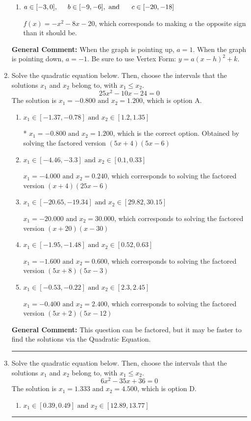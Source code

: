 \documentclass{extbook}[14pt]
\newcommand{\litem}[1]{\item #1

\rule{\textwidth}{0.4pt}}
\begin{document}
\begin{enumerate}
{\begin{enumerate}[label=\Alph*.]
* $f(x)=x^{2} +8 x + 12$, which is the correct option.
\item \( a \in [-3, 0], \hspace*{5mm} b \in [-9, -6], \text{ and } \hspace*{5mm} c \in [-20, -18] \)

$f(x)=-x^{2} -8 x -20$, which corresponds to making $a$ the opposite sign than it should be.
\end{enumerate}

\textbf{General Comment:} When the graph is pointing up, $a=1$. When the graph is pointing down, $a=-1$. Be sure to use Vertex Form: $y = a(x-h)^2+k$.
}
\litem{
Solve the quadratic equation below. Then, choose the intervals that the solutions $x_1$ and $x_2$ belong to, with $x_1 \leq x_2$.
\[ 25x^{2} -10 x -24 = 0 \]
The solution is \( x_1 = -0.800 \text{ and } x_2 = 1.200 \), which is option A.\begin{enumerate}[label=\Alph*.]
\item \( x_1 \in [-1.37, -0.78] \text{ and } x_2 \in [1.2, 1.35] \)

* $x_1 = -0.800 \text{ and } x_2 = 1.200$, which is the correct option. Obtained by solving the factored version $(5x + 4)(5x -6)$
\item \( x_1 \in [-4.46, -3.3] \text{ and } x_2 \in [0.1, 0.33] \)

$x_1 = -4.000 \text{ and } x_2 = 0.240$, which corresponds to solving the factored version $(x + 4)(25x -6)$
\item \( x_1 \in [-20.65, -19.34] \text{ and } x_2 \in [29.82, 30.15] \)

$x_1 = -20.000 \text{ and } x_2 = 30.000$, which corresponds to solving the factored version $(x + 20)(x -30)$
\item \( x_1 \in [-1.95, -1.48] \text{ and } x_2 \in [0.52, 0.63] \)

$x_1 = -1.600 \text{ and } x_2 = 0.600$, which corresponds to solving the factored version $(5x + 8)(5x -3)$
\item \( x_1 \in [-0.53, -0.22] \text{ and } x_2 \in [2.3, 2.45] \)

$x_1 = -0.400 \text{ and } x_2 = 2.400$, which corresponds to solving the factored version $(5x + 2)(5x -12)$
\end{enumerate}

\textbf{General Comment:} This question can be factored, but it may be faster to find the solutions via the Quadratic Equation.
}
\litem{
Solve the quadratic equation below. Then, choose the intervals that the solutions $x_1$ and $x_2$ belong to, with $x_1 \leq x_2$.
\[ 6x^{2} -35 x + 36 = 0 \]
The solution is \( x_1 = 1.333 \text{ and } x_2 = 4.500 \), which is option D.\begin{enumerate}[label=\Alph*.]
\item \( x_1 \in [0.39, 0.49] \text{ and } x_2 \in [12.89, 13.77] \)


\end{enumerate}}
\end{enumerate}
\end{document}

